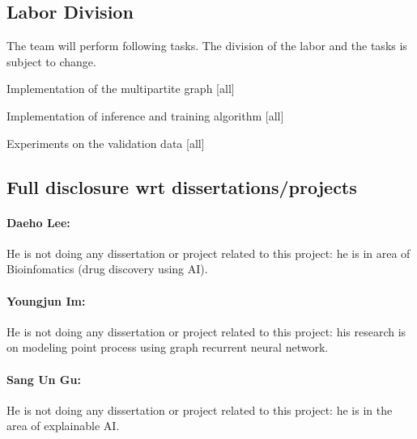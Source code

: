 \subsection{Labor Division}

The team will perform following tasks. The division of the labor and the tasks is subject to change.
\bit
\item Implementation of the multipartite graph [all]
\item Implementation of inference and training algorithm [all]
\item Experiments on the validation data [all]
\eit

\subsection{Full disclosure wrt dissertations/projects}

\paragraph{Daeho Lee:}
He is not doing any dissertation or project related to this project: he is in area of Bioinfomatics (drug discovery using AI).

\paragraph{Youngjun Im:}
He is not doing any dissertation or project related to this project: his research is on modeling point process using graph recurrent neural network.

\paragraph{Sang Un Gu:}
He is not doing any dissertation or project related to this project: he is in the area of explainable AI.
